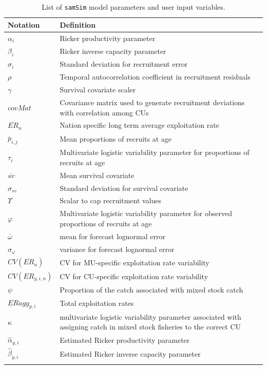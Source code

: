\documentclass[11pt]{book}
\begin{document}
\begin{longtable}[]{l p{13.5cm}}
\caption{List of \texttt{samSim} model parameters and user input variables.}\\
\hline
Notation & Definition \\ 
\hline
\endhead
$\alpha_{i}$ & Ricker productivity parameter \\
$\beta_{i}$ & Ricker inverse capacity parameter \\
$\sigma_{i}$ & Standard deviation for recruitment error\\ 
$\rho$ & Temporal autocorrelation coefficient in recruitment residuals\\
$\gamma$ & Survival covariate scaler \\
$covMat$ & Covariance matrix used to generate recruitment deviations with correlation among CUs\\
$\overline{ER}_{n}$ & Nation specific long term average exploitation rate\\
$\overline{p}_{i,j}$ & Mean proportions of recruits at age\\
$\tau_{i}$ & Multivariate logistic variability parameter for proportions of recruits at age\\
$\overline{sv}$ & Mean survival covariate \\
$\sigma_{sv}$ & Standard deviation for survival covariate\\
$\Upsilon$ & Scalar to cap recruitment values \\
$\varphi$ & Multivariate logistic variability parameter for observed proportions of recruits at age\\
$\overline{\omega}$ & mean for forecast lognormal error\\
$\sigma_{\omega}$ & variance for forecast lognormal error\\
$CV(\overline{ER}_{n})$ & CV for MU-specific exploitation rate variability \\
$CV(ER_{y,i,n})$ & CV for CU-specific exploitation rate variability\\
$\psi$ & Proportion of the catch associated with mixed stock catch\\
$ERagg_{y,i}$ & Total exploitation rates\\
$\kappa$ & multivariate logistic variability parameter associated with assigning catch in mixed stock fisheries to the correct CU\\
$\hat{\alpha}_{y,i}$ & Estimated Ricker productivity parameter \\
$\hat{\beta}_{y,i}$ & Estimated Ricker inverse capacity parameter \\
\hline
\label{tab:paramtab}
\end{longtable}
\end{document}
